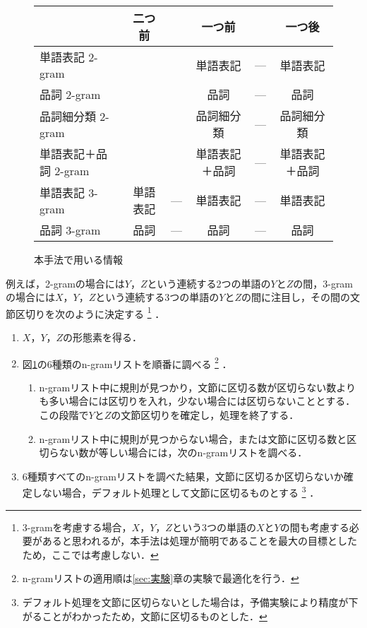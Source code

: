 \begin{figure}
  \begin{center}
    \begin{tabular}{l|ccccc}
      &
      二つ前   &     & 一つ前         &     & 一つ後\\
      \hline
      単語表記 2-gram &
      ~        &     & 単語表記       & --- & 単語表記\\
      品詞 2-gram &
      ~        &     & 品詞           & --- & 品詞\\
      品詞細分類 2-gram &
      ~        &     & 品詞細分類     & --- & 品詞細分類\\
      単語表記＋品詞 2-gram &
      ~        &     & 単語表記＋品詞 & --- & 単語表記＋品詞\\
      単語表記 3-gram &
      単語表記 & --- & 単語表記       & --- & 単語表記\\
      品詞 3-gram &
      品詞     & --- & 品詞           & --- & 品詞\\
    \end{tabular}
    \caption{本手法で用いる情報}
    
    
    
    \label{fig:本手法}
  \end{center}
\end{figure}

例えば，2-gramの場合には$Y$，$Z$という連続する2つの単語の$Y$と$Z$の間，3-gramの場合には$X$，$Y$，$Z$という連続する3つの単語の$Y$と$Z$の間に注目し，その間の文節区切りを次のように決定する
\footnote{
  3-gramを考慮する場合，$X$，$Y$，$Z$という3つの単語の$X$と$Y$の間も考慮する必要があると思われるが，本手法は処理が簡明であることを最大の目標としたため，ここでは考慮しない．
  }
．

\begin{enumerate}
\item $X$，$Y$，$Z$の形態素を得る．
\item 図\ref{fig:本手法}の6種類のn-gramリストを順番に調べる
  \footnote{
    n-gramリストの適用順は\ref{sec:実験}章の実験で最適化を行う．
    }
  ．
  \begin{enumerate}
  \item n-gramリスト中に規則が見つかり，文節に区切る数が区切らない数よりも多い場合には区切りを入れ，少ない場合には区切らないこととする．
    この段階で$Y$と$Z$の文節区切りを確定し，処理を終了する．
  \item n-gramリスト中に規則が見つからない場合，または文節に区切る数と区切らない数が等しい場合には，次のn-gramリストを調べる．
  \end{enumerate}
\item 6種類すべてのn-gramリストを調べた結果，文節に区切るか区切らないか確定しない場合，デフォルト処理として文節に区切るものとする
\footnote{
  デフォルト処理を文節に区切らないとした場合は，予備実験により精度が下がることがわかったため，文節に区切るものとした．
  }
．
\end{enumerate}

